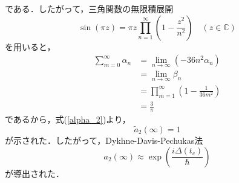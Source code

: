 である．したがって，三角関数の無限積展開
\begin{equation}
  \sin (\pi z) = \pi z \prod_{n=1}^{\infty} \left( 1-\frac{z^2}{n^2} \right) \quad (z \in \mathbb{C})
\end{equation}
を用いると，
\begin{align}
  \sum_{m=0}^{\infty} \alpha_n
  &= \lim_{n \rightarrow \infty} (-36n^2 \alpha_n)\\
  &= \lim_{n \rightarrow \infty} \beta_n\\
  &= \prod_{m=1}^{\infty} \left( 1-\frac{1}{36m^2} \right)\\
  &= \frac{3}{\pi}
\end{align}
であるから，式(\ref{alpha_2})より，
\begin{equation}
  \tilde{a}_2(\infty) = 1
\end{equation}
が示された．したがって，Dykhne-Davis-Pechukas法
\begin{equation}
  a_2(\infty) \approx \exp \left( \frac{i\Delta(t_c)}{\hbar} \right)
\end{equation}
が導出された．